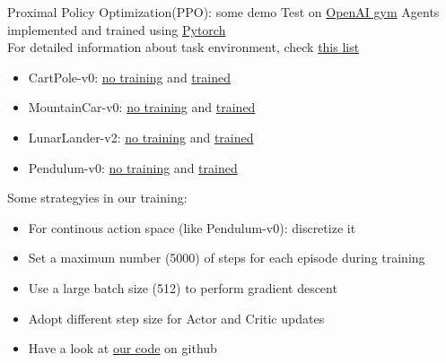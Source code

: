 \begin{frame}{Proximal Policy Optimization(PPO): some demo}
    \vspace{0.15cm}
    Test on \href{https://gym.openai.com/}{OpenAI gym} Agents implemented and trained using \href{https://en.wikipedia.org/wiki/PyTorch}{Pytorch}\\\vspace{0.15cm}
    For detailed information about task environment, check \href{https://github.com/openai/gym/wiki/Table-of-environments}{this list}\\\vspace{0.15cm}
    \begin{itemize}
        \item CartPole-v0: \href{https://www.youtube.com/watch?v=1bvTOM7Az3s}{no training} and \href{https://www.youtube.com/watch?v=l1gOoNFSq8E}{trained}
        \item MountainCar-v0: \href{https://www.youtube.com/watch?v=SAGHdqGvbzA}{no training} and \href{https://www.youtube.com/watch?v=6wYzj74x_l4}{trained}
        \item LunarLander-v2: \href{https://www.youtube.com/watch?v=ZFmx0l6Pe60}{no training} and \href{https://www.youtube.com/watch?v=BysTYEG4fDE}{trained}
        \item Pendulum-v0: \href{https://www.youtube.com/watch?v=bxojAfY5PPw&t=5s}{no training} and \href{https://www.youtube.com/watch?v=yasKyY3hE88}{trained}
    \end{itemize}
    Some strategyies in our training:\\\vspace{0.15cm}
     \begin{itemize}
        \item For continous action space (like Pendulum-v0): discretize it
        \item Set a maximum number (5000) of steps for each episode during training
        \item Use a large batch size (512) to perform gradient descent
        \item Adopt different step size for Actor and Critic updates
        \item Have a look at \href{https://github.com/JamesTuna/RL_collects/blob/master/PPO/PPO.py}{our code} on github
    \end{itemize}
\end{frame}

